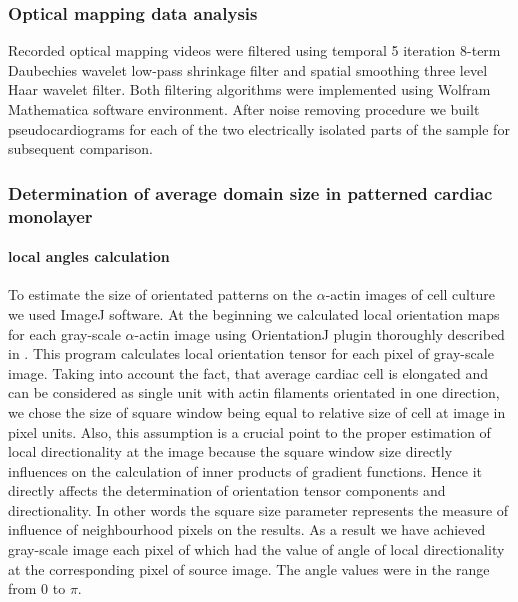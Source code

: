 \subsubsection{Optical mapping data analysis}
Recorded optical mapping videos were filtered using temporal 5 iteration 8-term Daubechies wavelet low-pass shrinkage filter and spatial smoothing three level Haar wavelet filter.
Both filtering algorithms were implemented using Wolfram Mathematica software environment.
After noise removing procedure we built pseudocardiograms for each of the two electrically isolated parts of the sample for subsequent comparison. 
\subsubsection{Determination of average domain size in patterned cardiac monolayer}  
\paragraph{local angles calculation}
To estimate the size of orientated patterns on the $\alpha$-actin images of cell culture we used ImageJ software.
At the beginning we calculated local orientation maps for each gray-scale $\alpha$-actin image using OrientationJ plugin thoroughly described in \cite{Bouten2011}.
This program calculates local orientation tensor for each pixel of gray-scale image.
Taking into account the fact, that average cardiac cell is elongated and can be considered as single unit with actin filaments orientated in one direction, we chose the size of square window being equal to relative size of cell at image in pixel units.
Also, this assumption is a crucial point to the proper estimation of local directionality at the image because the square window size directly influences on the calculation of inner products of gradient functions.
Hence it directly affects the determination of orientation tensor components and directionality.
In other words the square size parameter represents the measure of influence of neighbourhood pixels on the results.
As a result we have achieved gray-scale image each pixel of which had the value of angle of local directionality at the corresponding pixel of source image.
The angle values were in the range from 0 to $\pi$.      
